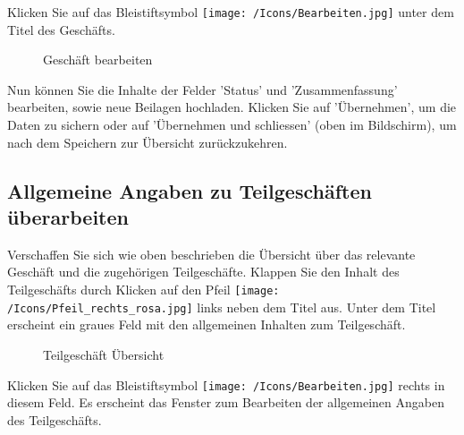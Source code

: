 Klicken Sie auf das Bleistiftsymbol \texttt{[image: /Icons/Bearbeiten.jpg]}  unter dem Titel des Geschäfts.

\begin{figure}[H]
\caption{Geschäft bearbeiten}
\end{figure}

Nun können Sie die Inhalte der Felder 'Status'  und 'Zusammenfassung'  bearbeiten, sowie neue Beilagen  hochladen. Klicken Sie auf 'Übernehmen',  um die Daten zu sichern oder auf 'Übernehmen und schliessen' (oben im Bildschirm), um nach dem Speichern zur Übersicht zurückzukehren.

\subsection{Allgemeine Angaben zu Teilgeschäften überarbeiten}

Verschaffen Sie sich wie oben beschrieben die Übersicht über das relevante Geschäft und die zugehörigen Teilgeschäfte. Klappen Sie den Inhalt des Teilgeschäfts durch Klicken auf den Pfeil \texttt{[image: /Icons/Pfeil\_rechts\_rosa.jpg]} links neben dem Titel aus. Unter dem Titel erscheint ein graues Feld  mit den allgemeinen Inhalten zum Teilgeschäft.

\begin{figure}[H]
\caption{Teilgeschäft Übersicht}
\end{figure}

Klicken Sie auf das Bleistiftsymbol \texttt{[image: /Icons/Bearbeiten.jpg]}  rechts in diesem Feld. Es erscheint das Fenster zum Bearbeiten der allgemeinen Angaben des Teilgeschäfts.

